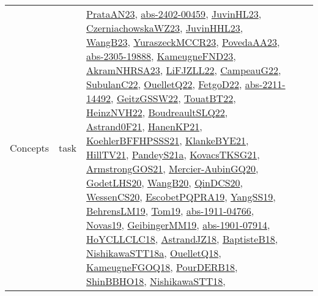 {\begin{longtable}{lp{3cm}>{\raggedright}p{6cm}>{\raggedright}p{6cm}p{8cm}}
Concepts & task & \href{articles/PrataAN23.pdf}{PrataAN23}\cite{PrataAN23}, \href{articles/abs-2402-00459.pdf}{abs-2402-00459}\cite{abs-2402-00459}, \href{papers/JuvinHL23.pdf}{JuvinHL23}\cite{JuvinHL23}, \href{articles/CzerniachowskaWZ23.pdf}{CzerniachowskaWZ23}\cite{CzerniachowskaWZ23}, \href{papers/JuvinHHL23.pdf}{JuvinHHL23}\cite{JuvinHHL23}, \href{papers/WangB23.pdf}{WangB23}\cite{WangB23}, \href{articles/YuraszeckMCCR23.pdf}{YuraszeckMCCR23}\cite{YuraszeckMCCR23}, \href{papers/PovedaAA23.pdf}{PovedaAA23}\cite{PovedaAA23}, \href{articles/abs-2305-19888.pdf}{abs-2305-19888}\cite{abs-2305-19888}, \href{papers/KameugneFND23.pdf}{KameugneFND23}\cite{KameugneFND23}, \href{articles/AkramNHRSA23.pdf}{AkramNHRSA23}\cite{AkramNHRSA23}, \href{papers/LiFJZLL22.pdf}{LiFJZLL22}\cite{LiFJZLL22}, \href{articles/CampeauG22.pdf}{CampeauG22}\cite{CampeauG22}, \href{articles/SubulanC22.pdf}{SubulanC22}\cite{SubulanC22}, \href{papers/OuelletQ22.pdf}{OuelletQ22}\cite{OuelletQ22}, \href{articles/FetgoD22.pdf}{FetgoD22}\cite{FetgoD22}, \href{articles/abs-2211-14492.pdf}{abs-2211-14492}\cite{abs-2211-14492}, \href{papers/GeitzGSSW22.pdf}{GeitzGSSW22}\cite{GeitzGSSW22}, \href{papers/TouatBT22.pdf}{TouatBT22}\cite{TouatBT22}, \href{articles/HeinzNVH22.pdf}{HeinzNVH22}\cite{HeinzNVH22}, \href{papers/BoudreaultSLQ22.pdf}{BoudreaultSLQ22}\cite{BoudreaultSLQ22}, \href{papers/Astrand0F21.pdf}{Astrand0F21}\cite{Astrand0F21}, \href{papers/HanenKP21.pdf}{HanenKP21}\cite{HanenKP21}, \href{articles/KoehlerBFFHPSSS21.pdf}{KoehlerBFFHPSSS21}\cite{KoehlerBFFHPSSS21}, \href{papers/KlankeBYE21.pdf}{KlankeBYE21}\cite{KlankeBYE21}, \href{papers/HillTV21.pdf}{HillTV21}\cite{HillTV21}, \href{articles/PandeyS21a.pdf}{PandeyS21a}\cite{PandeyS21a}, \href{papers/KovacsTKSG21.pdf}{KovacsTKSG21}\cite{KovacsTKSG21}, \href{papers/ArmstrongGOS21.pdf}{ArmstrongGOS21}\cite{ArmstrongGOS21}, \href{papers/Mercier-AubinGQ20.pdf}{Mercier-AubinGQ20}\cite{Mercier-AubinGQ20}, \href{papers/GodetLHS20.pdf}{GodetLHS20}\cite{GodetLHS20}, \href{papers/WangB20.pdf}{WangB20}\cite{WangB20}, \href{articles/QinDCS20.pdf}{QinDCS20}\cite{QinDCS20}, \href{papers/WessenCS20.pdf}{WessenCS20}\cite{WessenCS20}, \href{articles/EscobetPQPRA19.pdf}{EscobetPQPRA19}\cite{EscobetPQPRA19}, \href{papers/YangSS19.pdf}{YangSS19}\cite{YangSS19}, \href{papers/BehrensLM19.pdf}{BehrensLM19}\cite{BehrensLM19}, \href{papers/Tom19.pdf}{Tom19}\cite{Tom19}, \href{articles/abs-1911-04766.pdf}{abs-1911-04766}\cite{abs-1911-04766}, \href{articles/Novas19.pdf}{Novas19}\cite{Novas19}, \href{papers/GeibingerMM19.pdf}{GeibingerMM19}\cite{GeibingerMM19}, \href{articles/abs-1901-07914.pdf}{abs-1901-07914}\cite{abs-1901-07914}, \href{papers/HoYCLLCLC18.pdf}{HoYCLLCLC18}\cite{HoYCLLCLC18}, \href{papers/AstrandJZ18.pdf}{AstrandJZ18}\cite{AstrandJZ18}, \href{articles/BaptisteB18.pdf}{BaptisteB18}\cite{BaptisteB18}, \href{papers/NishikawaSTT18a.pdf}{NishikawaSTT18a}\cite{NishikawaSTT18a}, \href{papers/OuelletQ18.pdf}{OuelletQ18}\cite{OuelletQ18}, \href{papers/KameugneFGOQ18.pdf}{KameugneFGOQ18}\cite{KameugneFGOQ18}, \href{articles/PourDERB18.pdf}{PourDERB18}\cite{PourDERB18}, \href{articles/ShinBBHO18.pdf}{ShinBBHO18}\cite{ShinBBHO18}, \href{papers/NishikawaSTT18.pdf}{NishikawaSTT18}\cite{NishikawaSTT18}, 
\end{longtable}}

